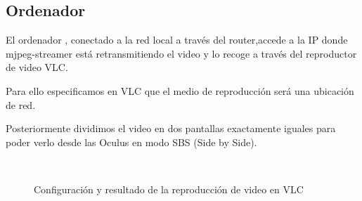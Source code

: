 \documentclass[twoside, 11pt]{epstfg}
\begin{document}
\newpage
\subsection{Ordenador}
El ordenador , conectado a la red local a través del router,accede a la IP donde mjpeg-streamer está retransmitiendo el video y lo recoge a través del reproductor de video VLC.

Para ello especificamos en VLC que el medio de reproducción será una ubicación de red.

Posteriormente dividimos el video en dos pantallas exactamente iguales para poder verlo desde las Oculus en modo SBS (Side by Side).

\begin{figure}[h]
	\centering
	\\
		\caption{Configuración y resultado de la reproducción de video en VLC} \label{figstream}
\end{figure}
\end{document}
